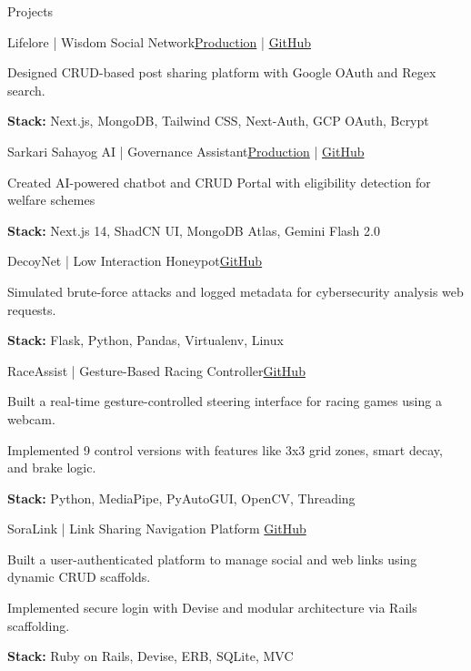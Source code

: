 \documentclass[10pt]{resume}
\begin{document}
\begin{rSection}{Projects}

\begin{rSubsection}{Lifelore | Wisdom Social Network}{\href{https://lifelore.vercel.app/}{Production} | \href{https://github.com/kintsugi-programmer/lifelore}{GitHub}}
    \item Designed CRUD-based post sharing platform with Google OAuth and Regex search.
    \item \textbf{Stack:} Next.js, MongoDB, Tailwind CSS, Next-Auth, GCP OAuth, Bcrypt
\end{rSubsection}

\begin{rSubsection}{Sarkari Sahayog AI | Governance Assistant}{\href{https://sarkarisahyogai.vercel.app/}{Production} | \href{https://github.com/kintsugi-programmer/SarkariSahyogAI}{GitHub}}
    \item Created AI-powered chatbot and CRUD Portal with eligibility detection for welfare schemes
    \item \textbf{Stack:} Next.js 14, ShadCN UI, MongoDB Atlas, Gemini Flash 2.0
\end{rSubsection}

\begin{rSubsection}{DecoyNet | Low Interaction Honeypot}{\href{https://github.com/kintsugi-programmer/DecoyNet}{GitHub}}
    \item Simulated brute-force attacks and logged metadata for cybersecurity analysis web requests.
    \item \textbf{Stack:} Flask, Python, Pandas, Virtualenv, Linux
\end{rSubsection}

\begin{rSubsection}{RaceAssist | Gesture-Based Racing Controller}{\href{https://github.com/kintsugi-programmer/race-ist}{GitHub}}
    \item Built a real-time gesture-controlled steering interface for racing games using a webcam.
    \item Implemented 9 control versions with features like 3x3 grid zones, smart decay, and brake logic.
    \item \textbf{Stack:} Python, MediaPipe, PyAutoGUI, OpenCV, Threading
\end{rSubsection}

\begin{rSubsection}{SoraLink | Link Sharing Navigation Platform}
{\href{https://github.com/kintsugi-programmer/soralink}{GitHub}}
   \item Built a user-authenticated platform to manage social and web links using dynamic CRUD scaffolds.
\item Implemented secure login with Devise and modular architecture via Rails scaffolding.
    \item \textbf{Stack:} Ruby on Rails, Devise, ERB, SQLite, MVC
\end{rSubsection}

\end{rSection}
\end{document}
